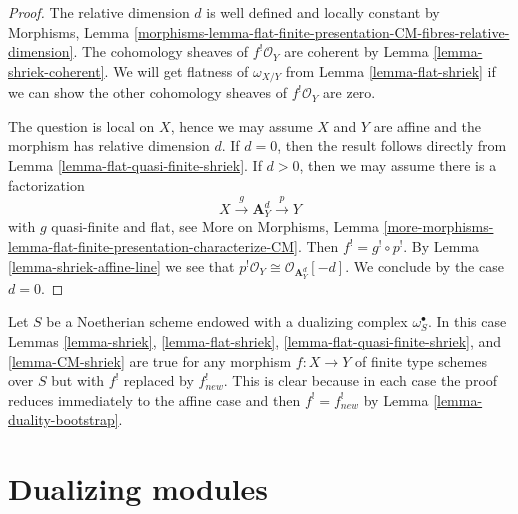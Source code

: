 \begin{proof}
The relative dimension $d$ is well defined and locally constant by
Morphisms, Lemma
\ref{morphisms-lemma-flat-finite-presentation-CM-fibres-relative-dimension}.
The cohomology sheaves of $f^!\mathcal{O}_Y$ are coherent by
Lemma \ref{lemma-shriek-coherent}.
We will get flatness of $\omega_{X/Y}$ from Lemma \ref{lemma-flat-shriek}
if we can show the other cohomology sheaves of $f^!\mathcal{O}_Y$
are zero.

\medskip\noindent
The question is local on $X$, hence we may assume $X$ and $Y$ are affine
and the morphism has relative dimension $d$. If $d = 0$, then the
result follows directly from Lemma \ref{lemma-flat-quasi-finite-shriek}.
If $d > 0$, then we may assume there is a factorization
$$
X \xrightarrow{g} \mathbf{A}^d_Y \xrightarrow{p} Y
$$
with $g$ quasi-finite and flat, see More on Morphisms, Lemma
\ref{more-morphisms-lemma-flat-finite-presentation-characterize-CM}.
Then $f^! = g^! \circ p^!$. By Lemma \ref{lemma-shriek-affine-line}
we see that $p^!\mathcal{O}_Y \cong \mathcal{O}_{\mathbf{A}^d_Y}[-d]$.
We conclude by the case $d = 0$.
\end{proof}

\begin{remark}
\label{remark-the-same-is-true}
Let $S$ be a Noetherian scheme endowed with a dualizing complex
$\omega_S^\bullet$. In this case
Lemmas \ref{lemma-shriek}, \ref{lemma-flat-shriek},
\ref{lemma-flat-quasi-finite-shriek}, and \ref{lemma-CM-shriek}
are true for any morphism $f : X \to Y$ of finite type schemes over $S$
but with $f^!$ replaced by $f_{new}^!$. This is clear because in each
case the proof reduces immediately to the affine case
and then $f^! = f_{new}^!$ by Lemma \ref{lemma-duality-bootstrap}.
\end{remark}




\section{Dualizing modules}
\label{section-dualizing-module}

